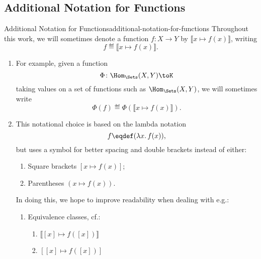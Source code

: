 \subsection{Additional Notation for Functions}\label{section-additional-notation-for-functions}
\begin{notation}{Additional Notation for Functions}{additional-notation-for-functions}%
    Throughout this work, we will sometimes denote a function $f\colon X\to Y$ by $\llbracket x\mapsto f(x)\rrbracket$, writing
    \[
        f%
        \eqdef%
        \llbracket x\mapsto f(x)\rrbracket.%
    \]%
    \begin{enumerate}
        \item\label{additional-notation-for-functions-1}For example, given a function%
            \[
                \Phi%
                \colon%
                \Hom_{\Sets}(X,Y)%
                \to%
                K%
            \]%
            taking values on a set of functions such as $\Hom_{\Sets}(X,Y)$, we will sometimes write
            \[
                \Phi(f)%
                \eqdef%
                \Phi(\llbracket x\mapsto f(x)\rrbracket).%
            \]%
        \item\label{additional-notation-for-functions-2}This notational choice is based on the lambda notation
            \[
                f%
                \eqdef%
                (\lambda x\ldotp f(x)),%
            \]%
            but uses a \say{$\mathord{\mapsto}$} symbol for better spacing and double brackets instead of either:
            \begin{enumerate}
                \item\label{additional-notation-for-functions-2-a}Square brackets $[x\mapsto f(x)]$;
                \item\label{additional-notation-for-functions-2-b}Parentheses $(x\mapsto f(x))$.
            \end{enumerate}
            In doing this, we hope to improve readability when dealing with e.g.:
            \begin{enumerate}
                \item\label{additional-notation-for-functions-2-c}Equivalence classes, cf.:
                    \begin{enumerate}
                        \item\label{additional-notation-for-functions-2-c-i}$\llbracket[x]\mapsto f([x])\rrbracket$%
                        \item\label{additional-notation-for-functions-2-c-ii}$[[x]\mapsto f([x])]$%

\end{enumerate}
\end{enumerate}
\end{enumerate}
\end{notation}
